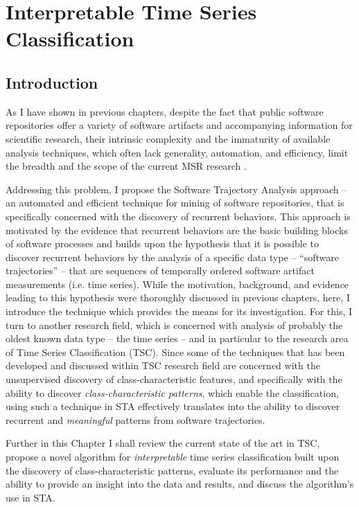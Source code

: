 \chapter{Interpretable Time Series Classification}\label{chapter_sax_vsm}

\section{Introduction}
As I have shown in previous chapters, despite the fact that public software repositories offer a variety of software 
artifacts and accompanying information for scientific research, their intrinsic complexity and the immaturity of 
available analysis techniques, which often lack generality, automation, and efficiency, limit the breadth 
and the scope of the current MSR research \cite{citeulike:7853299} \cite{citeulike:12550438}.

Addressing this problem, I propose the Software Trajectory Analysis approach -- an automated and efficient technique
for mining of software repositories, that is specifically concerned with the discovery of recurrent behaviors.
This approach is motivated by the evidence that recurrent behaviors are the basic building blocks of software 
processes \cite{neal2012habits} \cite{1903} \cite{citeulike:13208461} and builds upon the hypothesis that it is 
possible to discover recurrent behaviors by the analysis of a specific data type -- ``software trajectories'' -- 
that are sequences of temporally ordered software artifact measurements (i.e. time series).
While the motivation, background, and evidence leading to this hypothesis were thoroughly discussed in 
previous chapters, here, I introduce the technique which provides the means for its investigation. 
For this, I turn to another research field, which is concerned with analysis of probably the oldest known 
data type -- the time series \cite{citeulike:1454223} -- and in particular to the research area of 
Time Series Classification (TSC). Since some of the techniques that has been developed and discussed 
within TSC research field are concerned with the unsupervised discovery of class-characteristic features, 
and specifically with the ability to discover \textit{class-characteristic patterns}, which enable the classification, 
using such a technique in STA effectively translates into the ability to discover recurrent and \textit{meaningful} 
patterns from software trajectories. 

Further in this Chapter I shall review the current state of the art in TSC, 
propose a novel algorithm for \textit{interpretable} time series classification built upon the discovery of 
class-characteristic patterns, evaluate its performance and the ability to provide an insight into the data and results, 
and discuss the algorithm's use in STA.


